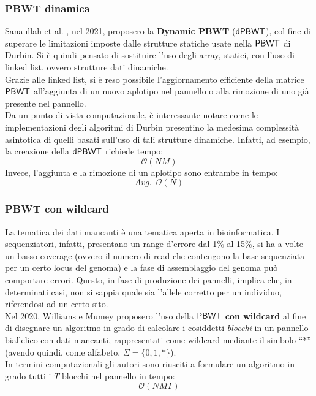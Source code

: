 \subsubsection{PBWT dinamica}
Sanaullah et al. \cite{dpbwt}, nel 2021, proposero la \textbf{Dynamic PBWT}
($\mbox{\rm {\sf dPBWT}}$), 
 col fine di superare le limitazioni imposte dalle strutture
statiche usate nella $\mbox{\rm {\sf PBWT}}$ di Durbin. Si è quindi pensato di sostituire
l'uso degli array, statici, con l'uso di linked list, ovvero strutture dati
dinamiche.\\ 
Grazie alle linked list, si è reso possibile l'aggiornamento
efficiente della matrice $\mbox{\rm {\sf PBWT}}$ all'aggiunta di un nuovo aplotipo nel
pannello o alla rimozione di uno già presente nel pannello.\\
Da un punto di vista computazionale, è interessante notare come le
implementazioni degli algoritmi di Durbin presentino la medesima complessità
asintotica di quelli basati sull'uso di tali strutture dinamiche. Infatti, ad
esempio, la creazione della $\mbox{\rm {\sf dPBWT}}$ richiede 
tempo:
\begin{equation}
  \label{eq:dpbwt}
  \mathcal{O}(NM)
\end{equation}
Invece, l'aggiunta e la rimozione di un aplotipo sono entrambe in tempo:
\begin{equation}
  \label{eq:dpbwt1}
  Avg.\,\,\,\mathcal{O}(N)
\end{equation}
\subsubsection{PBWT con wildcard}
La tematica dei dati mancanti è una tematica aperta in
bioinformatica. I sequenziatori, infatti, presentano un range d'errore
dal 1\% al 15\%, si ha a volte un basso coverage (ovvero il numero di
read che contengono la base sequenziata per un certo locus del genoma) e la fase
di assemblaggio del genoma può comportare errori. Questo, in fase di produzione
dei pannelli, implica che, in determinati casi, non si sappia quale sia l'allele
corretto per un individuo, riferendosi ad un certo sito. \\
Nel 2020, Williams e Mumey \cite{williams} proposero l'uso della
$\mbox{\rm {\sf PBWT}}$ \textbf{con 
  wildcard} al fine di disegnare un algoritmo in grado di calcolare i cosiddetti
\textit{blocchi} in un pannello biallelico con dati mancanti, rappresentati come
wildcard mediante il simbolo ``*'' (avendo quindi, come alfabeto,
$\Sigma=\{0,1,*\}$).\\ 
In termini computazionali gli autori sono riusciti a formulare un algoritmo in
grado tutti i $T$ blocchi nel pannello in
tempo: 
\begin{equation}
  \label{eq:pbwtwild}
  \mathcal{O}(NMT)
\end{equation}
